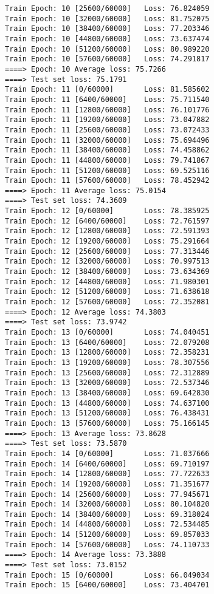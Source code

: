\documentclass[11pt]{article}
\begin{document}
\begin{Verbatim}[commandchars=\\\{\}]
Train Epoch: 10 [25600/60000]   Loss: 76.824059
Train Epoch: 10 [32000/60000]   Loss: 81.752075
Train Epoch: 10 [38400/60000]   Loss: 77.203346
Train Epoch: 10 [44800/60000]   Loss: 73.637474
Train Epoch: 10 [51200/60000]   Loss: 80.989220
Train Epoch: 10 [57600/60000]   Loss: 74.291817
====> Epoch: 10 Average loss: 75.7266
====> Test set loss: 75.1791
Train Epoch: 11 [0/60000]       Loss: 81.585602
Train Epoch: 11 [6400/60000]    Loss: 75.711540
Train Epoch: 11 [12800/60000]   Loss: 76.101776
Train Epoch: 11 [19200/60000]   Loss: 73.047882
Train Epoch: 11 [25600/60000]   Loss: 73.072433
Train Epoch: 11 [32000/60000]   Loss: 75.694496
Train Epoch: 11 [38400/60000]   Loss: 74.458862
Train Epoch: 11 [44800/60000]   Loss: 79.741867
Train Epoch: 11 [51200/60000]   Loss: 69.525116
Train Epoch: 11 [57600/60000]   Loss: 78.452942
====> Epoch: 11 Average loss: 75.0154
====> Test set loss: 74.3609
Train Epoch: 12 [0/60000]       Loss: 78.385925
Train Epoch: 12 [6400/60000]    Loss: 72.761597
Train Epoch: 12 [12800/60000]   Loss: 72.591393
Train Epoch: 12 [19200/60000]   Loss: 75.291664
Train Epoch: 12 [25600/60000]   Loss: 77.313446
Train Epoch: 12 [32000/60000]   Loss: 70.997513
Train Epoch: 12 [38400/60000]   Loss: 73.634369
Train Epoch: 12 [44800/60000]   Loss: 71.980301
Train Epoch: 12 [51200/60000]   Loss: 71.638618
Train Epoch: 12 [57600/60000]   Loss: 72.352081
====> Epoch: 12 Average loss: 74.3803
====> Test set loss: 73.9742
Train Epoch: 13 [0/60000]       Loss: 74.040451
Train Epoch: 13 [6400/60000]    Loss: 72.079208
Train Epoch: 13 [12800/60000]   Loss: 72.358231
Train Epoch: 13 [19200/60000]   Loss: 78.307556
Train Epoch: 13 [25600/60000]   Loss: 72.312889
Train Epoch: 13 [32000/60000]   Loss: 72.537346
Train Epoch: 13 [38400/60000]   Loss: 69.642830
Train Epoch: 13 [44800/60000]   Loss: 74.637100
Train Epoch: 13 [51200/60000]   Loss: 76.438431
Train Epoch: 13 [57600/60000]   Loss: 75.166145
====> Epoch: 13 Average loss: 73.8628
====> Test set loss: 73.5870
Train Epoch: 14 [0/60000]       Loss: 71.037666
Train Epoch: 14 [6400/60000]    Loss: 69.710197
Train Epoch: 14 [12800/60000]   Loss: 77.722633
Train Epoch: 14 [19200/60000]   Loss: 71.351677
Train Epoch: 14 [25600/60000]   Loss: 77.945671
Train Epoch: 14 [32000/60000]   Loss: 80.104820
Train Epoch: 14 [38400/60000]   Loss: 69.318024
Train Epoch: 14 [44800/60000]   Loss: 72.534485
Train Epoch: 14 [51200/60000]   Loss: 69.857033
Train Epoch: 14 [57600/60000]   Loss: 74.110733
====> Epoch: 14 Average loss: 73.3888
====> Test set loss: 73.0152
Train Epoch: 15 [0/60000]       Loss: 66.049034
Train Epoch: 15 [6400/60000]    Loss: 73.404701

\end{Verbatim}
\end{document}

